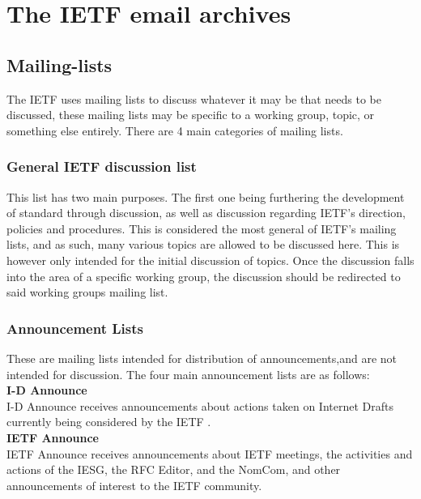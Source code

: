 \documentclass[a4paper,english]{report}
\begin{document}
\section{The IETF email archives}

\subsection{Mailing-lists}

The IETF uses mailing lists to discuss whatever it may be that needs to be discussed, these mailing lists may be specific to a working group, topic, or something else entirely. There are 4 main categories of mailing lists.\\


\subsubsection{General IETF discussion list}
This list has two main purposes. The first one being furthering the development of standard through discussion, as well as discussion regarding IETF’s direction, policies and procedures. This is considered the most general of IETF’s mailing lists, and as such, many various topics are allowed to be discussed here. This is however only intended for the initial discussion of topics. Once the discussion falls into the area of a specific working group, the discussion should be redirected to said working groups mailing list. \\



\subsubsection{Announcement Lists}
These are mailing lists intended for distribution of announcements,and are not intended for discussion. The four main announcement lists are as follows:\\

\noindent
\textbf{I-D Announce}\\
 I-D Announce receives announcements about actions taken on Internet Drafts currently being considered by the IETF .\\


\noindent
\textbf{IETF Announce} \\
IETF Announce receives announcements about IETF meetings, the activities and actions of the IESG, the RFC Editor, and the NomCom, and other announcements of interest to the IETF community.\\
\end{document}

